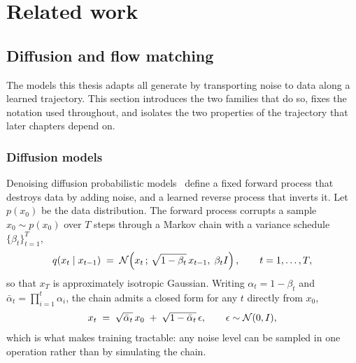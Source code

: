 %
\chapter{Related work}
\label{ch:related-work}

\section{Diffusion and flow matching}
\label{sec:rw-generative}

The models this thesis adapts all generate by transporting noise to data
along a learned trajectory. This section introduces the two families that
do so, fixes the notation used throughout, and isolates the two properties
of the trajectory that later chapters depend on.

\subsection{Diffusion models}
\label{sec:rw-diffusion}

Denoising diffusion probabilistic models~\citep{sohldickstein2015diffusion,
ho2020ddpm} define a fixed forward process that destroys data by adding
noise, and a learned reverse process that inverts it. Let $p(x_0)$ be the data distribution. The forward process
corrupts a sample $x_0 \sim p(x_0)$ over $T$ steps through a Markov chain
with a variance schedule $\{\beta_t\}_{t=1}^{T}$,
\begin{equation}
  \label{eq:forward-step}
  q(x_t \mid x_{t-1}) \;=\; \mathcal{N}\!\left(x_t \,;\, \sqrt{1-\beta_t}\,x_{t-1},\; \beta_t I\right),
  \qquad t = 1,\dots,T,
\end{equation}
so that $x_T$ is approximately isotropic Gaussian. Writing
$\alpha_t = 1-\beta_t$ and $\bar{\alpha}_t = \prod_{i=1}^{t}\alpha_i$, the
chain admits a closed form for any $t$ directly from $x_0$,
\begin{equation}
  \label{eq:forward-marginal}
  x_t \;=\; \sqrt{\bar{\alpha}_t}\,x_0 \;+\; \sqrt{1-\bar{\alpha}_t}\,\epsilon,
  \qquad \epsilon \sim \mathcal{N}(0, I),
\end{equation}
which is what makes training tractable: any noise level can be sampled in
one operation rather than by simulating the chain.

